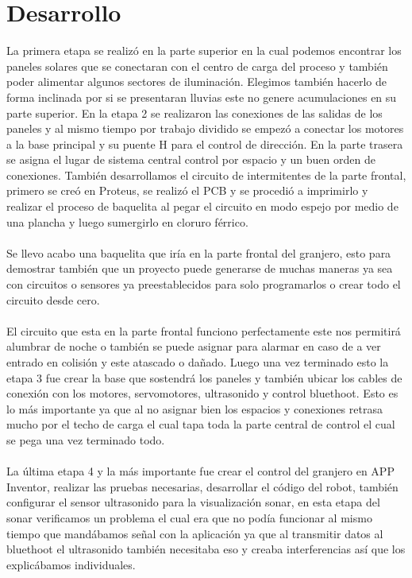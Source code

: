 \documentclass[11pt,a4paper]{article}
\begin{document}
\section{Desarrollo}
La primera etapa se realizó en la parte superior en la cual podemos encontrar los paneles solares que se conectaran con el centro de carga del proceso y también poder alimentar algunos sectores de iluminación.
Elegimos también hacerlo de forma inclinada por si se presentaran lluvias este no genere acumulaciones en su parte superior.
En la etapa 2 se realizaron las conexiones de las salidas de los paneles y al mismo tiempo por trabajo dividido se empezó a conectar los motores a la base principal y su puente H para el control de dirección. En la parte trasera se asigna el lugar de sistema central control por espacio y un buen orden de conexiones.
También desarrollamos el circuito de intermitentes de la parte frontal, primero se creó en Proteus, se realizó el PCB y se procedió a imprimirlo y realizar el proceso de baquelita al pegar el circuito en modo espejo por medio de una plancha y luego sumergirlo en cloruro férrico.\\\\
Se llevo acabo una baquelita que iría en la parte frontal del granjero, esto para demostrar también que un proyecto puede generarse de muchas maneras ya sea con circuitos o sensores ya preestablecidos para solo programarlos o crear todo el circuito desde cero.\\\\
El circuito que esta en la parte frontal funciono perfectamente este nos permitirá alumbrar de noche o también se puede asignar para alarmar en caso de a ver entrado en colisión y este atascado o dañado.
Luego una vez terminado esto la etapa 3 fue crear la base que sostendrá los paneles y también ubicar los cables de conexión con los motores, servomotores, ultrasonido y control bluethoot. Esto es lo más importante ya que al no asignar bien los espacios y conexiones retrasa mucho por el techo de carga el cual tapa toda la parte central de control el cual se pega una vez terminado todo.\\\\
La última etapa 4 y la más importante fue crear el control del granjero en APP Inventor, realizar las pruebas necesarias, desarrollar el código del robot, también configurar el sensor ultrasonido para la visualización sonar, en esta etapa del sonar verificamos un problema el cual era que no podía funcionar al mismo tiempo que mandábamos señal con la aplicación ya que al transmitir datos al bluethoot el ultrasonido también necesitaba eso y creaba interferencias así que los explicábamos individuales.\\\\
\end{document}
